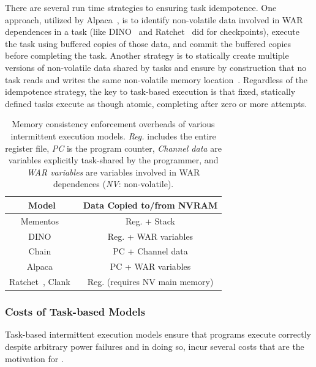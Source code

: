 There are several run time strategies to ensuring task idempotence. One approach, utilized by Alpaca~\cite{alpaca}, is to identify non-volatile data involved in WAR dependences in a task (like DINO~\cite{dino} and Ratchet~\cite{ratchet} did for checkpoints), execute the task using buffered copies of those data, and commit the buffered copies before completing the task. Another strategy is to statically create multiple versions of non-volatile data shared by tasks and ensure by construction that no task reads and writes the same non-volatile memory location~\cite{chain}. Regardless of the idempotence strategy, the key to task-based execution is that fixed, statically defined tasks execute as though atomic, completing after zero or more attempts. 

\begin{table}
	\centering
	\footnotesize
	\begin{tabular}{|c|c|}
		\hline
		Model & Data Copied to/from NVRAM \\
		\hline\hline
		Mementos~\cite{mementos}                             & Reg. + Stack     \\
		DINO~\cite{dino}                                     & Reg. + WAR variables \\
		Chain~\cite{chain}                                   & PC   + Channel data\\
		Alpaca~\cite{alpaca}                                 & PC   + WAR variables \\
		Ratchet~\cite{ratchet}, Clank~\cite{hicks_isca_2017} & Reg. (requires NV main memory) \\
		\hline
	\end{tabular}
	\caption{Memory consistency enforcement overheads of various intermittent execution models. \emph{Reg.} includes the entire register file, \emph{PC} is the program counter, \emph{Channel data} are variables explicitly task-shared by the programmer, and \emph{WAR variables} are variables involved in WAR dependences (\emph{NV}: non-volatile).}
	\label{table:chechpoint_comparison}
\end{table}

\subsubsection{Costs of Task-based Models}

Task-based intermittent execution models ensure that programs execute correctly despite arbitrary power failures and in doing so, incur several costs that are the motivation for \sys. 

